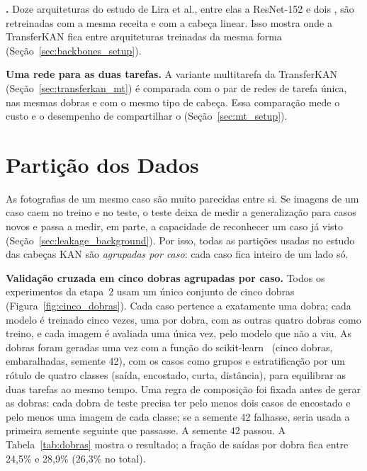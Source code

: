 

\textbf{.} Doze arquiteturas do estudo de Lira et al., entre elas a ResNet-152 e dois , são retreinadas com a mesma receita e com a cabeça linear. Isso mostra onde a TransferKAN fica entre arquiteturas treinadas da mesma forma (Seção~\ref{sec:backbones_setup}).

\textbf{Uma rede para as duas tarefas.} A variante multitarefa da TransferKAN (Seção~\ref{sec:transferkan_mt}) é comparada com o par de redes de tarefa única, nas mesmas dobras e com o mesmo tipo de cabeça. Essa comparação mede o custo e o desempenho de compartilhar o  (Seção~\ref{sec:mt_setup}).

\section{Partição dos Dados}
\label{sec:particao}

As fotografias de um mesmo caso são muito parecidas entre si. Se imagens de um caso caem no treino e no teste, o teste deixa de medir a generalização para casos novos e passa a medir, em parte, a capacidade de reconhecer um caso já visto (Seção~\ref{sec:leakage_background}). Por isso, todas as partições usadas no estudo das cabeças KAN são \emph{agrupadas por caso}: cada caso fica inteiro de um lado só.

\textbf{Validação cruzada em cinco dobras agrupadas por caso.} Todos os experimentos da etapa~2 usam um único conjunto de cinco dobras (Figura~\ref{fig:cinco_dobras}). Cada caso pertence a exatamente uma dobra; cada modelo é treinado cinco vezes, uma por dobra, com as outras quatro dobras como treino, e cada imagem é avaliada uma única vez, pelo modelo que não a viu. As dobras foram geradas uma vez com a função  do scikit-learn~\cite{pedregosa2011scikit} (cinco dobras, embaralhadas, semente 42), com os casos como grupos e estratificação por um rótulo de quatro classes (saída, encostado, curta, distância), para equilibrar as duas tarefas ao mesmo tempo. Uma regra de composição foi fixada antes de gerar as dobras: cada dobra de teste precisa ter pelo menos dois casos de encostado e pelo menos uma imagem de cada classe; se a semente 42 falhasse, seria usada a primeira semente seguinte que passasse. A semente 42 passou. A Tabela~\ref{tab:dobras} mostra o resultado; a fração de saídas por dobra fica entre 24,5\% e 28,9\% (26,3\% no total).

